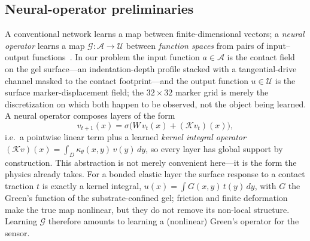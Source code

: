 \documentclass[conference]{IEEEtran}
\begin{document}
\subsection{Neural-operator preliminaries}\label{sec:method-no}
A conventional network learns a map between finite-dimensional vectors; a
\emph{neural operator} learns a map $\mathcal{G}:\mathcal{A}\to\mathcal{U}$
between \emph{function spaces} from pairs of input--output
functions~\cite{kovachki2023neuraloperator}. In our problem the input function
$a\in\mathcal{A}$ is the contact field on the gel surface---an indentation-depth
profile stacked with a tangential-drive channel masked to the contact
footprint---and the output function $u\in\mathcal{U}$ is the surface
marker-displacement field; the $32\times32$ marker grid is merely the
discretization on which both happen to be observed, not the object being
learned. A neural operator composes layers of the form
\begin{equation}
v_{t+1}(x) = \sigma\!\Big(W\,v_t(x) + (\mathcal{K}v_t)(x)\Big),
\label{eq:no-layer}
\end{equation}
i.e.\ a pointwise linear term plus a learned \emph{kernel integral operator}
$(\mathcal{K}v)(x)=\int_{D}\kappa_\theta(x,y)\,v(y)\,dy$,
so every layer has global support by construction. This abstraction is not
merely convenient here---it is the form the physics already takes. For a bonded
elastic layer the surface response to a contact traction $t$ is exactly a
kernel integral, $u(x)=\int G(x,y)\,t(y)\,dy$, with $G$ the Green's function of
the substrate-confined gel; friction and finite deformation make the true map
nonlinear, but they do not remove its non-local structure. Learning
$\mathcal{G}$ therefore amounts to learning a (nonlinear) Green's operator for
the sensor.
\end{document}
